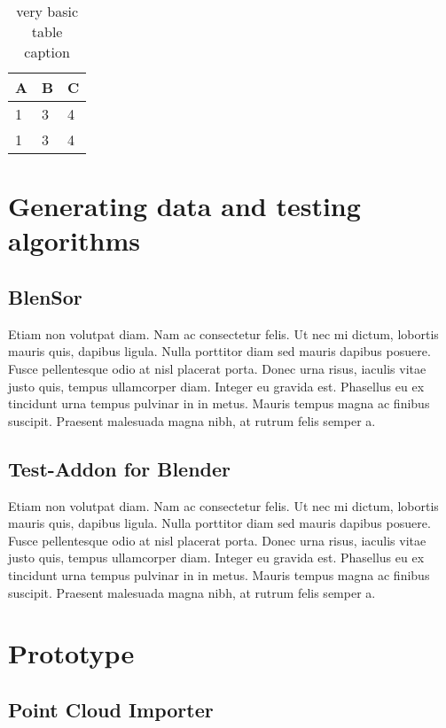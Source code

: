 \begin{table}[h]
	\centering
	\begin{tabular}{l | l | l}
		A & B & C \\
		\hline
		1 & 3 & 4 \\
		1 & 3 & 4 \\
	\end{tabular}
	\caption{very basic table caption}
	\label{tab:abc}
\end{table}



\section{Generating data and testing algorithms}

\subsection{BlenSor}

Etiam non volutpat diam. Nam ac consectetur felis. Ut nec mi dictum, lobortis mauris quis, dapibus ligula. Nulla porttitor diam sed mauris dapibus posuere. Fusce pellentesque odio at nisl placerat porta. Donec urna risus, iaculis vitae justo quis, tempus ullamcorper diam. Integer eu gravida est. Phasellus eu ex tincidunt urna tempus pulvinar in in metus. Mauris tempus magna ac finibus suscipit. Praesent malesuada magna nibh, at rutrum felis semper a.

\subsection{Test-Addon for Blender}

Etiam non volutpat diam. Nam ac consectetur felis. Ut nec mi dictum, lobortis mauris quis, dapibus ligula. Nulla porttitor diam sed mauris dapibus posuere. Fusce pellentesque odio at nisl placerat porta. Donec urna risus, iaculis vitae justo quis, tempus ullamcorper diam. Integer eu gravida est. Phasellus eu ex tincidunt urna tempus pulvinar in in metus. Mauris tempus magna ac finibus suscipit. Praesent malesuada magna nibh, at rutrum felis semper a.

\section{Prototype}

\subsection{Point Cloud Importer}

